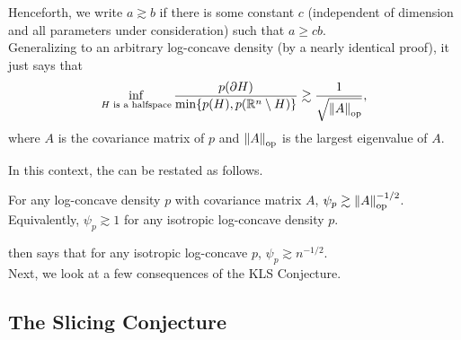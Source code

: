 \documentclass{article}
\begin{document}
	Henceforth, we write $a\gtrsim b$ if there is some constant $c$ (independent of dimension and all parameters under consideration) such that $a \geq c b$.\\
	Generalizing  to an arbitrary log-concave density (by a nearly identical proof), it just says that
	\[ \inf_{H\text{ is a halfspace}} \frac{p(\partial H)}{\min\{p(H),p(\mathbb{R}^n\setminus H)\}} \gtrsim \frac{1}{\sqrt{\left\lVert A\right\rVert_{\text{op}}}}, \]
	where $A$ is the covariance matrix of $p$ and $\left\lVert A\right\rVert_{\text{op}}$ is the largest eigenvalue of $A$.

	In this context, the  can be restated as follows. 

	\begin{fcon}
		\label{con: kls conjecture reformulated}
		For any log-concave density $p$ with covariance matrix $A$, $\psi_p \gtrsim \left\lVert A\right\rVert_{\text{op}}^{-1/2}$. Equivalently, $\psi_p\gtrsim 1$ for any isotropic log-concave density $p$.
	\end{fcon}

	 then says that for any isotropic log-concave $p$, $\psi_p \gtrsim n^{-1/2}$.\\





	Next, we look at a few consequences of the KLS Conjecture.

	\subsection{The Slicing Conjecture}
\end{document}

